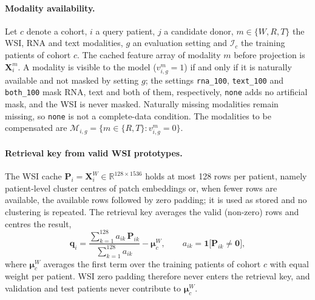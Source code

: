 \documentclass[pdflatex,sn-vancouver-num]{sn-jnl}
\begin{document}
\paragraph{Modality availability.}
Let $c$ denote a cohort, $i$ a query patient, $j$ a candidate donor,
$m\in\{W,R,T\}$ the WSI, RNA and text modalities, $g$ an evaluation setting
and $\mathcal{I}_c$ the training patients of cohort $c$. The cached feature
array of modality $m$ before projection is $\mathbf{X}_i^{m}$.
A modality is visible to the model ($v_{i,g}^{m}=1$) if and only if it is
naturally available and not masked by setting $g$; the settings
\texttt{rna\_100}, \texttt{text\_100} and \texttt{both\_100} mask RNA, text
and both of them, respectively, \texttt{none} adds no artificial mask, and the
WSI is never masked. Naturally missing modalities remain missing, so
\texttt{none} is not a complete-data condition. The modalities to be
compensated are $\mathcal{M}_{i,g}=\{m\in\{R,T\}:v_{i,g}^{m}=0\}$.

\paragraph{Retrieval key from valid WSI prototypes.}
The WSI cache $\mathbf{P}_i=\mathbf{X}_i^{W}\in\mathbb{R}^{128\times1536}$
holds at most 128 rows per patient, namely patient-level cluster centres of
patch embeddings or, when fewer rows are available, the available rows
followed by zero padding; it is used as stored and no clustering is repeated.
The retrieval key averages the valid (non-zero) rows and centres the result,
\begin{equation}
  \mathbf{q}_i
  =\frac{\sum_{k=1}^{128}a_{ik}\,\mathbf{P}_{ik}}{\sum_{k=1}^{128}a_{ik}}
   -\boldsymbol{\mu}_c^{W},
  \qquad
  a_{ik}=\mathbf{1}\bigl[\mathbf{P}_{ik}\neq\mathbf{0}\bigr],
  \label{eq:pr-key}
\end{equation}
where $\boldsymbol{\mu}_c^{W}$ averages the first term over the training
patients of cohort $c$ with equal weight per patient. WSI zero padding
therefore never enters the retrieval key, and validation and test patients
never contribute to $\boldsymbol{\mu}_c^{W}$.
\end{document}
